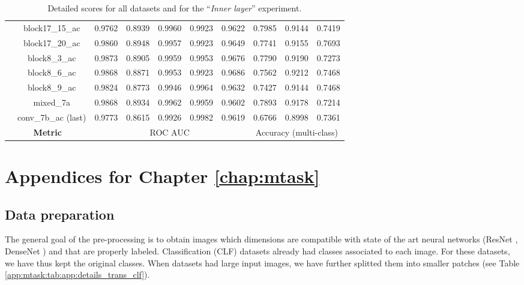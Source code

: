 \begin{table}
\begin{tabular}{|c|c|ccccc|ccc|}
    & block17\_15\_ac & 0.9762 & 0.8939 & 0.9960 & 0.9923 & 0.9622 & 0.7985 & 0.9144 & 0.7419 \\
    & block17\_20\_ac & 0.9860 & 0.8948 & 0.9957 & 0.9923 & 0.9649 & 0.7741 & 0.9155 & 0.7693 \\
    & block8\_3\_ac & 0.9873 & 0.8905 & 0.9959 & 0.9953 & 0.9676 & 0.7790 & 0.9190 & 0.7273 \\
    & block8\_6\_ac & 0.9868 & 0.8871 & 0.9953 & 0.9923 & 0.9686 & 0.7562 & 0.9212 & 0.7468 \\
    & block8\_9\_ac & 0.9824 & 0.8773 & 0.9946 & 0.9964 & 0.9632 & 0.7427 & 0.9144 & 0.7468 \\
    & mixed\_7a & 0.9868 & 0.8934 & 0.9962 & 0.9959 & 0.9602 & 0.7893 & 0.9178 & 0.7214 \\
    & conv\_7b\_ac (last) & 0.9773 & 0.8615 & 0.9926 & 0.9982 & 0.9619 & 0.6766 & 0.8998 & 0.7361 \\
    \hline
    \multicolumn{2}{|c|}{\textbf{Metric}} & \multicolumn{5}{c|}{ROC AUC} & \multicolumn{3}{c|}{Accuracy (multi-class)} \\
    \hline
  \end{tabular}
  \caption{Detailed scores for all datasets and for the ``\textit{Inner layer}'' experiment.}
  \label{app:comp:tab:detailed_second}
\end{table}

\chapter{Appendices for Chapter \ref{chap:mtask}}
\label{app:mtask:app:mtask}

\section{Data preparation}
\label{app:mtask:sec:app:datasets}

The general goal of the pre-processing is to obtain images which dimensions are compatible with state of the art neural networks (\eg ResNet \cite{he2016deep}, DenseNet \cite{huang2017densely}) and that are properly labeled. Classification (CLF) datasets already had classes associated to each image. For these datasets, we have thus kept the original classes. When datasets had large input images, we have further splitted them into smaller patches (see Table \ref{app:mtask:tab:app:details_trans_clf}).


